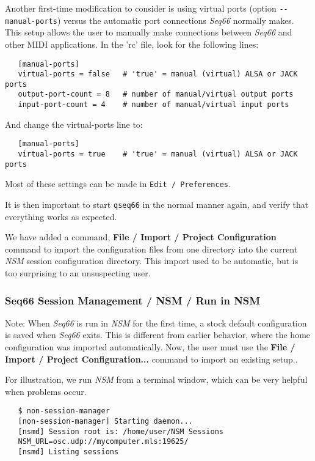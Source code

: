    Another first-time modification to consider is using virtual ports (option
   \texttt{-{}-manual-ports}) versus the automatic port connections
   \textsl{Seq66} normally makes.
   This setup allows the user to manually make connections between
   \textsl{Seq66} and other MIDI applications.
   In the 'rc' file, look for the following lines:

\begin{verbatim}
   [manual-ports]
   virtual-ports = false   # 'true' = manual (virtual) ALSA or JACK ports
   output-port-count = 8   # number of manual/virtual output ports
   input-port-count = 4    # number of manual/virtual input ports
\end{verbatim}

   And change the virtual-ports line to:

\begin{verbatim}
   [manual-ports]
   virtual-ports = true    # 'true' = manual (virtual) ALSA or JACK ports
\end{verbatim}

   Most of these settings can be made in \texttt{Edit / Preferences}.

   It is then important to start \texttt{qseq66} in the normal manner again,
   and verify that everything works as expected.

   We have added a command, \textbf{File / Import / Project Configuration}
   command to import the configuration files from one directory into the
   current \textsl{NSM} session configuration directory.
   This import used to be automatic, but is too surprising to an unsuspecting
   user.

\subsubsection{Seq66 Session Management / NSM / Run in NSM}
\label{subsec:sessions_nsm_first_run_in_nsm}

   Note: When \textsl{Seq66} is run in \textsl{NSM} for the first time,
   a stock default configuration is saved when
   \textsl{Seq66} exits.
   This is different from earlier behavior, where the home configuration was
   imported automatically.
   Now, the user must use the
   \textbf{File / Import / Project Configuration...}
   command to import an existing setup..

   For illustration, we run \textsl{NSM} from a terminal window, which can be
   very helpful when problems occur.

\begin{verbatim}
   $ non-session-manager
   [non-session-manager] Starting daemon...
   [nsmd] Session root is: /home/user/NSM Sessions
   NSM_URL=osc.udp://mycomputer.mls:19625/
   [nsmd] Listing sessions
\end{verbatim}

